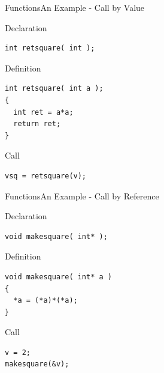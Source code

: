 \documentclass{beamer}
\begin{document}
\begin{frame}[fragile]{Functions}{An Example - Call by Value}
\begin{block}{Declaration}
\begin{verbatim}
int retsquare( int );
\end{verbatim}
\end{block}
\begin{block}{Definition}
\begin{verbatim}
int retsquare( int a );
{
  int ret = a*a;
  return ret;
}
\end{verbatim}
\end{block}
\begin{block}{Call}
\begin{verbatim}
vsq = retsquare(v);
\end{verbatim}
\end{block}
\end{frame}

\begin{frame}[fragile]{Functions}{An Example - Call by Reference}
\begin{block}{Declaration}
\begin{verbatim}
void makesquare( int* );
\end{verbatim}
\end{block}
\begin{block}{Definition}
\begin{verbatim}
void makesquare( int* a )
{
  *a = (*a)*(*a);
}
\end{verbatim}
\end{block}
\begin{block}{Call}
\begin{verbatim}
v = 2;
makesquare(&v);
\end{verbatim}
\end{block}
\end{frame}
\end{document}
